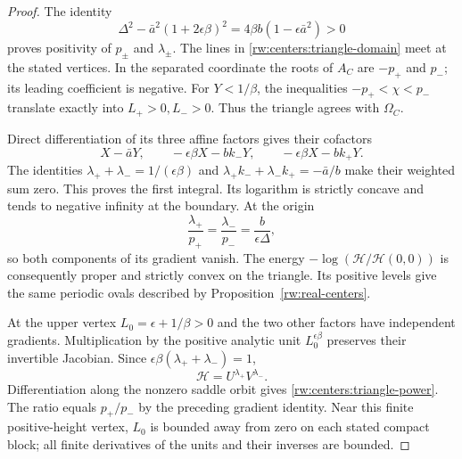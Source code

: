 \begin{proof}
The identity
\[
 \Delta^2-\bar a^2(1+2\epsilon\beta)^2
       =4\beta b(1-\epsilon\bar a^2)>0
\]
proves positivity of $p_\pm$ and $\lambda_\pm$.
The lines in \eqref{rw:centers:triangle-domain} meet at the stated
vertices. In the separated coordinate the roots of $A_C$ are
$-p_+$ and $p_-$; its leading coefficient is negative.
For $Y<1/\beta$, the inequalities
$-p_+<\chi<p_-$ translate exactly into $L_+>0,L_->0$.
Thus the triangle agrees with $\Omega_C$.

Direct differentiation of its three affine factors gives their
cofactors
\[
 X-\bar aY,\qquad
 -\epsilon\beta X-bk_-Y,\qquad
 -\epsilon\beta X-bk_+Y.
\]
The identities
$\lambda_++\lambda_-=1/(\epsilon\beta)$ and
$\lambda_+k_-+\lambda_-k_+=-\bar a/b$
make their weighted sum zero. This proves the first integral.
Its logarithm is strictly concave and tends to negative infinity
at the boundary. At the origin
\[
 \frac{\lambda_+}{p_+}=\frac{\lambda_-}{p_-}
                  =\frac{b}{\epsilon\Delta},
\]
so both components of its gradient vanish. The energy
$-\log(\mathcal H/\mathcal H(0,0))$ is consequently proper and
strictly convex on the triangle. Its positive levels give the same
periodic ovals described by Proposition~\ref{rw:real-centers}.

At the upper vertex $L_0=\epsilon+1/\beta>0$ and the two other
factors have independent gradients. Multiplication by the positive
analytic unit $L_0^{\epsilon\beta}$ preserves their invertible
Jacobian. Since $\epsilon\beta(\lambda_++\lambda_-)=1$,
\[
 \mathcal H=U^{\lambda_+}V^{\lambda_-}.
\]
Differentiation along the nonzero saddle orbit gives
\eqref{rw:centers:triangle-power}. The ratio equals $p_+/p_-$ by
the preceding gradient identity. Near this finite positive-height
vertex, $L_0$ is bounded away from zero on each stated compact block;
all finite derivatives of the units and their inverses are bounded.
\end{proof}

